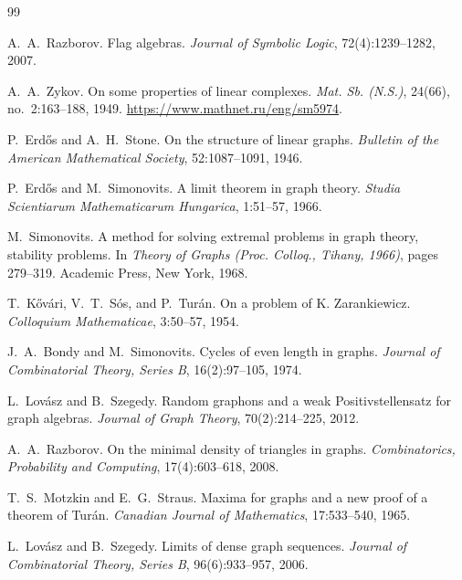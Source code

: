 \documentclass[11pt]{article}
\theoremstyle{definition}
\begin{document}
\begin{thebibliography}{99}

A.~A.~Razborov.
\newblock Flag algebras.
\newblock \emph{Journal of Symbolic Logic}, 72(4):1239--1282, 2007.

A.~A.~Zykov.
\newblock On some properties of linear complexes.
\newblock \emph{Mat. Sb. (N.S.)}, 24(66), no.~2:163--188, 1949.
\newblock \url{https://www.mathnet.ru/eng/sm5974}.

P.~Erd\H{o}s and A.~H.~Stone.
\newblock On the structure of linear graphs.
\newblock \emph{Bulletin of the American Mathematical Society}, 52:1087--1091, 1946.

P.~Erd\H{o}s and M.~Simonovits.
\newblock A limit theorem in graph theory.
\newblock \emph{Studia Scientiarum Mathematicarum Hungarica}, 1:51--57, 1966.

M.~Simonovits.
\newblock A method for solving extremal problems in graph theory, stability problems.
\newblock In \emph{Theory of Graphs (Proc. Colloq., Tihany, 1966)}, pages 279--319.
\newblock Academic Press, New York, 1968.

T.~K\H{o}v\'ari, V.~T.~S\'os, and P.~Tur\'an.
\newblock On a problem of K. Zarankiewicz.
\newblock \emph{Colloquium Mathematicae}, 3:50--57, 1954.

J.~A.~Bondy and M.~Simonovits.
\newblock Cycles of even length in graphs.
\newblock \emph{Journal of Combinatorial Theory, Series B}, 16(2):97--105, 1974.

L.~Lov\'asz and B.~Szegedy.
\newblock Random graphons and a weak Positivstellensatz for graph algebras.
\newblock \emph{Journal of Graph Theory}, 70(2):214--225, 2012.

A.~A.~Razborov.
\newblock On the minimal density of triangles in graphs.
\newblock \emph{Combinatorics, Probability and Computing}, 17(4):603--618, 2008.

T.~S.~Motzkin and E.~G.~Straus.
\newblock Maxima for graphs and a new proof of a theorem of Tur\'an.
\newblock \emph{Canadian Journal of Mathematics}, 17:533--540, 1965.

L.~Lov\'asz and B.~Szegedy.
\newblock Limits of dense graph sequences.
\newblock \emph{Journal of Combinatorial Theory, Series B}, 96(6):933--957, 2006.


\end{thebibliography}
\end{document}
